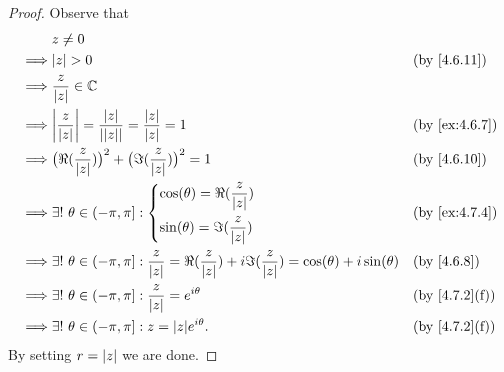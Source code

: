 \begin{proof}
  Observe that
  \begin{align*}
             & z \neq 0                                                                                                                                                                     \\
    \implies & \abs{z} > 0                                                                                                                                 &  & \by{4.6.11}                 \\
    \implies & \dfrac{z}{\abs{z}} \in \C                                                                                                                                                    \\
    \implies & \abs{\dfrac{z}{\abs{z}}} = \dfrac{\abs{z}}{\abs{\abs{z}}} = \dfrac{\abs{z}}{\abs{z}} = 1                                                    &  & \by{ex:4.6.7}               \\
    \implies & \big(\Re(\dfrac{z}{\abs{z}})\big)^2 + \big(\Im(\dfrac{z}{\abs{z}})\big)^2 = 1                                                               &  & \by{4.6.10}                 \\
    \implies & \exists!\ \theta \in (-\pi, \pi] : \begin{dcases}
                                                    \cos(\theta) = \Re(\dfrac{z}{\abs{z}}) \\
                                                    \sin(\theta) = \Im(\dfrac{z}{\abs{z}})
                                                  \end{dcases}                                                                    &  & \by{ex:4.7.4}                                        \\
    \implies & \exists!\ \theta \in (-\pi, \pi] : \dfrac{z}{\abs{z}} = \Re(\dfrac{z}{\abs{z}}) + i \Im(\dfrac{z}{\abs{z}}) = \cos(\theta) + i \sin(\theta) &  & \by{4.6.8}                  \\
    \implies & \exists!\ \theta \in (-\pi, \pi] : \dfrac{z}{\abs{z}} = e^{i \theta}                                                                        &  & \text{(by \cref{4.7.2}(f))} \\
    \implies & \exists!\ \theta \in (-\pi, \pi] : z = \abs{z} e^{i \theta}.                                                                                &  & \text{(by \cref{4.7.2}(f))}
  \end{align*}
  By setting \(r = \left\lvert z\right\rvert\) we are done.
\end{proof}

